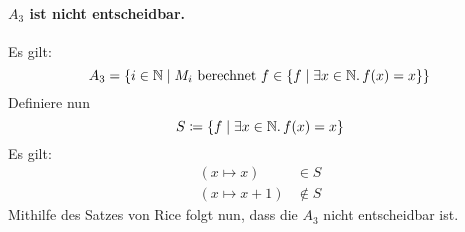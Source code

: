\paragraph{$A_3$ ist nicht entscheidbar.}
Es gilt:
\[
	A_3 = \{ i \in \Nat \mid M_i\ \text{berechnet}\ f \in \{f \mid
	\exists x \in \Nat .\, f(x) = x\} \}
\]
Definiere nun
\[
	S \coloneqq \{f \mid \exists x \in \mathbb{N} .\, f(x) = x\}
\]
Es gilt:
\begin{align*}
	(x \mapsto x) & \in S \\
	(x \mapsto x+1) & \notin S
\end{align*}
Mithilfe des Satzes von Rice folgt nun, dass die $A_3$ nicht entscheidbar ist.
\par
